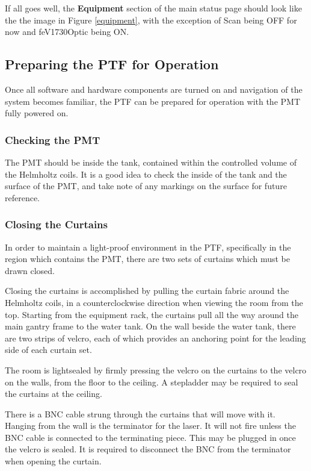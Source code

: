 \documentclass[twoside,letterpaper]{refart}
\begin{document}
If all goes well, the \textbf{Equipment} section of the main status page should look like the the image in Figure \ref{equipment}, with the exception of Scan being OFF for now and feV1730Optic being ON. 

\subsection{Preparing the PTF for Operation}

Once all software and hardware components are turned on and navigation of the system becomes familiar, the PTF can be prepared for operation with the PMT fully powered on. 

\subsubsection{Checking the PMT}

The PMT should be inside the tank, contained within the controlled volume of the Helmholtz coils. It is a good idea to check the inside of the tank and the surface of the PMT, and take note of any markings on the surface for future reference.

\subsubsection{Closing the Curtains}

In order to maintain a light-proof environment in the  PTF, specifically in the region which contains the PMT, there are two sets of curtains which must be drawn closed.

Closing the curtains is accomplished by pulling the curtain fabric around the Helmholtz coils, in a counterclockwise direction when viewing the room from the top.  Starting from the equipment rack, the curtains pull all the way around the main gantry frame to the water tank.  On the wall beside the water tank, there are two strips of velcro, each of which provides an anchoring point for the leading side of each curtain set. 

The room is lightsealed by firmly pressing the velcro on the curtains to the velcro on the walls, from the floor to the ceiling.  A stepladder may be required to seal the curtains at the ceiling. 

There is a BNC cable strung through the curtains that will move with it. Hanging from the wall is the terminator for the laser. It will not fire unless the BNC cable is connected to the terminating piece. This may be plugged in once the velcro is sealed. It is required to disconnect the BNC from the terminator when opening the curtain.
\end{document}
